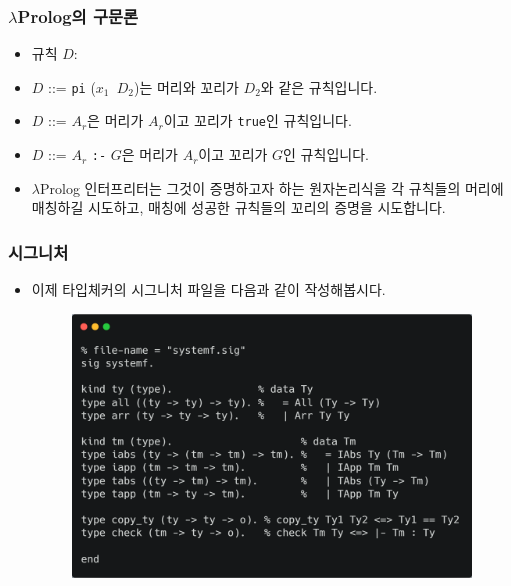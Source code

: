 \documentclass[slidestop,compress,mathserif]{beamer}
\begin{document}
    \begin{frame}
        \frametitle{$\lambda$Prolog의 구문론}
        \begin{itemize}
            \item 규칙 $D$:
            \item $D$ ::= \texttt{pi} ($x_1$\texttt{\string\ }$D_2$)는 머리와 꼬리가 $D_2$와 같은 규칙입니다.
            \item $D$ ::= $A_r$은 머리가 $A_r$이고 꼬리가 \texttt{true}인 규칙입니다.
            \item $D$ ::= $A_r$ \texttt{:-} $G$은 머리가 $A_r$이고 꼬리가 $G$인 규칙입니다.
            \item $\lambda$Prolog 인터프리터는 그것이 증명하고자 하는 원자논리식을 각 규칙들의 머리에 매칭하길 시도하고, 매칭에 성공한 규칙들의 꼬리의 증명을 시도합니다.
        \end{itemize}
    \end{frame}

    \begin{frame}
        \frametitle{시그니처}
        \begin{itemize}
            \item 이제 타입체커의 시그니처 파일을 다음과 같이 작성해봅시다.
            \begin{figure}[h]
                \begin{center}
                    \includegraphics[width=1.0\linewidth]{sig.png}
                \end{center}
            \end{figure}
        \end{itemize}
    \end{frame}
\end{document}
